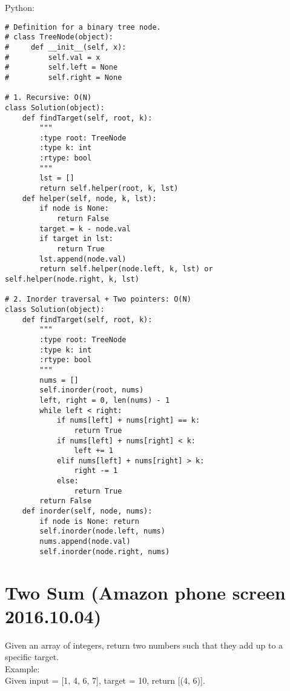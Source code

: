 Python:
\lstset{language=python}
\begin{lstlisting}
# Definition for a binary tree node.
# class TreeNode(object):
#     def __init__(self, x):
#         self.val = x
#         self.left = None
#         self.right = None

# 1. Recursive: O(N)
class Solution(object):
    def findTarget(self, root, k):
        """
        :type root: TreeNode
        :type k: int
        :rtype: bool
        """
        lst = []
        return self.helper(root, k, lst)
    def helper(self, node, k, lst):
        if node is None: 
            return False
        target = k - node.val
        if target in lst:
            return True
        lst.append(node.val)
        return self.helper(node.left, k, lst) or self.helper(node.right, k, lst)

# 2. Inorder traversal + Two pointers: O(N)
class Solution(object):
    def findTarget(self, root, k):
        """
        :type root: TreeNode
        :type k: int
        :rtype: bool
        """
        nums = []
        self.inorder(root, nums)
        left, right = 0, len(nums) - 1
        while left < right:
            if nums[left] + nums[right] == k:
                return True
            if nums[left] + nums[right] < k:
                left += 1
            elif nums[left] + nums[right] > k: 
                right -= 1
            else:
                return True
        return False
    def inorder(self, node, nums):
        if node is None: return
        self.inorder(node.left, nums)
        nums.append(node.val)
        self.inorder(node.right, nums)
\end{lstlisting}
        
\section{Two Sum (Amazon phone screen 2016.10.04)}
Given an array of integers, return two numbers such that they add up to a specific target. \\

Example:\\
Given input = [1, 4, 6, 7], target = 10, return [(4, 6)]. \\


